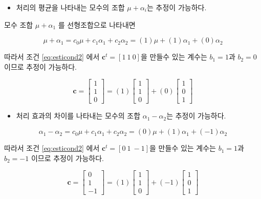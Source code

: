 \documentclass[
  10pt,
]{book}
\providecommand{\tightlist}{%
  \setlength{\itemsep}{0pt}\setlength{\parskip}{0pt}}
\theoremstyle{definition}
\theoremstyle{definition}
\theoremstyle{definition}
\theoremstyle{definition}
\theoremstyle{remark}
\begin{document}
\begin{itemize}
\tightlist
\item
  처리의 평균을 나타내는 모수의 조합 \(\mu + \alpha_i\)는 추정이 가능하다.
\end{itemize}

모수 조합 \(\mu + \alpha_1\) 를 선형조합으로 나타내면

\[ \mu + \alpha_1 = c_0 \mu + c_1 \alpha_1 + c_2 \alpha_2 = (1) \mu + (1) \alpha_1 + (0) \alpha_2 \]

따라서 조건 \eqref{eq:esticond2} 에서 \(\bm c^t = [1~1~0]\)을 만들수 있는 계수는 \(b_1=1\)과 \(b_2=0\) 이므로 추정이 가능하다.

\begin{equation*}
\bm c =
\begin{bmatrix}
1 \\
1 \\
0 
\end{bmatrix}
= 
(1)
\begin{bmatrix}
1 \\
1 \\
0 
\end{bmatrix}
+ 
(0)
\begin{bmatrix}
1 \\
0 \\
1 
\end{bmatrix}
\end{equation*}

\begin{itemize}
\tightlist
\item
  처리 효과의 차이를 나타내는 모수의 조합 \(\alpha_1-\alpha_2\)는 추정이 가능하다.
\end{itemize}

\[ \alpha_1 -\alpha_2= c_0 \mu + c_1 \alpha_1 + c_2 \alpha_2 = (0) \mu + (1) \alpha_1 + (-1) \alpha_2 \]

따라서 조건 \eqref{eq:esticond2} 에서 \(\bm c^t = [0~1~-1]\)을 만들수 있는 계수는 \(b_1=1\)과 \(b_2=-1\) 이므로 추정이 가능하다.

\begin{equation*}
\bm c =
\begin{bmatrix}
0 \\
1 \\
-1 
\end{bmatrix}
= 
(1)
\begin{bmatrix}
1 \\
1 \\
0 
\end{bmatrix}
+ 
(-1)
\begin{bmatrix}
1 \\
0 \\
1 
\end{bmatrix}
\end{equation*}
\end{document}
